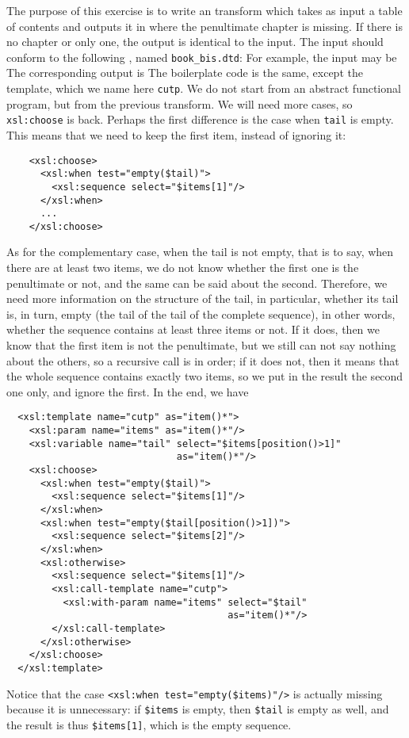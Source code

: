 The purpose of this exercise is to write an \XSLT transform which
takes as input a table of contents and outputs it in \XML where the
penultimate chapter is missing. If there is no chapter or only one,
the output is identical to the input. The input should conform to the
following \DTD, named \texttt{book\_bis.dtd}:
\noindent For example, the input may be
\noindent The corresponding output is
\noindent The boilerplate \XSLT code is the same, except the template,
which we name here \texttt{cutp}. We do not start from an abstract
functional program, but from the previous transform. We will need more
cases, so \texttt{xsl:choose} is back. Perhaps the first difference is
the case when \texttt{tail} is empty. This means that we need to keep
the first item, instead of ignoring it:
\begin{verbatim}
    <xsl:choose>
      <xsl:when test="empty($tail)">
        <xsl:sequence select="$items[1]"/>
      </xsl:when>
      ...
    </xsl:choose>
\end{verbatim}
As for the complementary case, when the tail is not empty, that is to
say, when there are at least two items, we do not know whether the
first one is the penultimate or not, and the same can be said about
the second. Therefore, we need more information on the structure of
the tail, in particular, whether its tail is, in turn, empty (the tail
of the tail of the complete sequence), in other words, whether the
sequence contains at least three items or not. If it does, then we
know that the first item is not the penultimate, but we still can not
say nothing about the others, so a recursive call is in order; if it
does not, then it means that the whole sequence contains exactly two
items, so we put in the result the second one only, and ignore the
first. In the end, we have
\begin{verbatim}
  <xsl:template name="cutp" as="item()*">
    <xsl:param name="items" as="item()*"/>
    <xsl:variable name="tail" select="$items[position()>1]"
                              as="item()*"/>
    <xsl:choose>
      <xsl:when test="empty($tail)">
        <xsl:sequence select="$items[1]"/>
      </xsl:when>
      <xsl:when test="empty($tail[position()>1])">
        <xsl:sequence select="$items[2]"/>
      </xsl:when>
      <xsl:otherwise>
        <xsl:sequence select="$items[1]"/>
        <xsl:call-template name="cutp">
          <xsl:with-param name="items" select="$tail"
                                       as="item()*"/>
        </xsl:call-template>
      </xsl:otherwise>
    </xsl:choose>
  </xsl:template>
\end{verbatim}
Notice that the case \texttt{<xsl:when test="empty(\$items)"/>} is
actually missing because it is unnecessary: if \texttt{\$items} is
empty, then \texttt{\$tail} is empty as well, and the result is thus
\texttt{\$items[1]}, which is the empty sequence.

